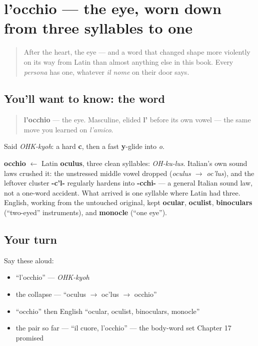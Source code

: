 \section[l'occhio]{l'occhio — the eye, worn down from three syllables to one}

\label{lesson:IT-C24-occhio}



\begin{quote}
After the heart, the eye — and a word that changed shape more violently on its way from Latin than almost anything else in this book. Every \emph{persona} has one, whatever \emph{il nome} on their door says.
\end{quote}

\subsection*{You'll want to know: the word}
\begin{quote}
\textbf{l'occhio} — the eye. Masculine, elided \textbf{l'} before its own vowel — the same move you learned on \emph{l'amico}.
\end{quote}

Said \emph{OHK-kyoh}: a hard \textbf{c}, then a fast \textbf{y}-glide into \emph{o}.

\begin{cousinweb}
\textbf{occhio} $\leftarrow$ Latin \textbf{oculus}, three clean syllables: \emph{OH-ku-lus}. Italian's own sound laws crushed it: the unstressed middle vowel dropped (\emph{oculus $\to$ oc'lus}), and the leftover cluster \textbf{-c'l-} regularly hardens into \textbf{-cchi-} — a general Italian sound law, not a one-word accident. What arrived is one syllable where Latin had three. English, working from the untouched original, kept \textbf{ocular}, \textbf{oculist}, \textbf{binoculars} (\textquotedblleft{}two-eyed\textquotedblright{} instruments), and \textbf{monocle} (\textquotedblleft{}one eye\textquotedblright{}).
\end{cousinweb}

\subsection*{Your turn}
Say these aloud:

\begin{itemize}
\raggedright
  \item \textquotedblleft{}l'occhio\textquotedblright{} — \emph{OHK-kyoh}
  \item the collapse — \textquotedblleft{}oculus $\to$ oc'lus $\to$ occhio\textquotedblright{}
  \item \textquotedblleft{}occhio\textquotedblright{} then English \textquotedblleft{}ocular, oculist, binoculars, monocle\textquotedblright{}
  \item the pair so far — \textquotedblleft{}il cuore, l'occhio\textquotedblright{} — the body-word set Chapter 17 promised
\end{itemize}

